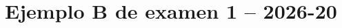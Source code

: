 \documentclass{exam}
\title{Ejemplo B de examen 1 -- 2026-20}
\begin{document}
\makeexamheader


\newpage
\programmingGrid
\newpage

\newpage

\programmingGrid
\end{document}
